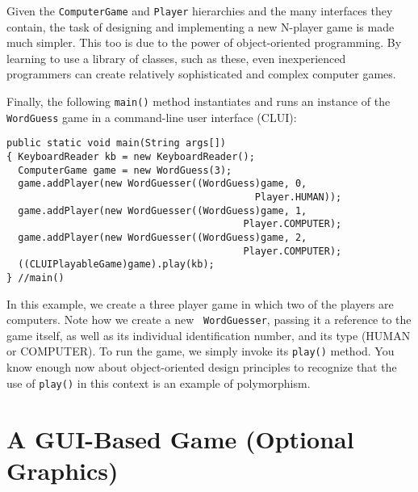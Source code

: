 Given the {\tt ComputerGame} and {\tt Player} hierarchies and
the many interfaces they contain, the task of designing and
implementing a new N-player game is made much simpler. This too is due
to the power of object-oriented programming. By learning to use a
library of classes, such as these, even inexperienced programmers can
create relatively sophisticated and complex computer games.


Finally, the following {\tt main()} method instantiates and runs an instance
of the {\tt WordGuess} game in a command-line user interface (CLUI):

\begin{jjjlisting}
\begin{lstlisting}
public static void main(String args[]) 
{ KeyboardReader kb = new KeyboardReader();
  ComputerGame game = new WordGuess(3);
  game.addPlayer(new WordGuesser((WordGuess)game, 0, 
                                           Player.HUMAN));
  game.addPlayer(new WordGuesser((WordGuess)game, 1, 
                                         Player.COMPUTER);
  game.addPlayer(new WordGuesser((WordGuess)game, 2, 
                                         Player.COMPUTER);
  ((CLUIPlayableGame)game).play(kb);
} //main()
\end{lstlisting}
\end{jjjlisting}

\noindent In this example, we create a three player game in which two
of the players are computers.  Note how we create a new {\tt
WordGuesser}, passing it a reference to the game itself, as well as
its individual identification number, and its type (HUMAN or
COMPUTER).  To run the game, we simply invoke its {\tt play()} method.
You know enough now about object-oriented design principles to
recognize that the use of {\tt play()} in this context is an example
of polymorphism.


\section{A GUI-Based Game (Optional Graphics)}
\label{agui-based-game-optional-graphics}



